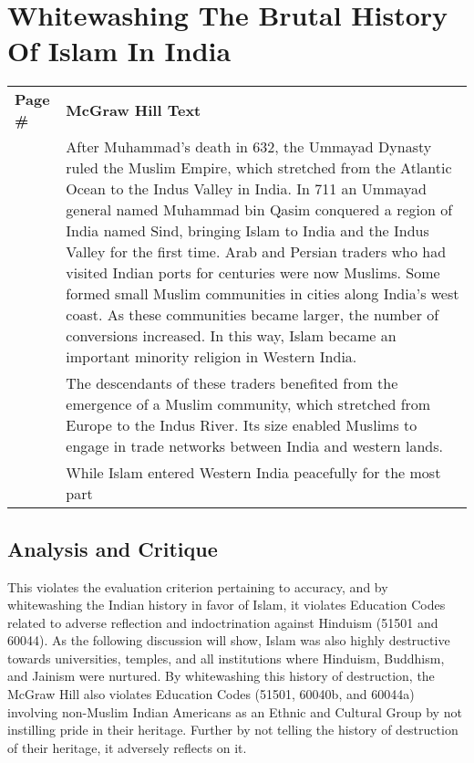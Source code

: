 \chapter{Whitewashing The Brutal History Of Islam In India}

\begin{longtable}{|>{\raggedleft}p{1.5cm}|p{8.5cm}|}
\multicolumn{2}{c}{\textbf{Table: 1}}\\ 
\hline
\textbf{Page \#} & \textbf{McGraw Hill Text} \tabularnewline
\hline
166 & After Muhammad’s death in 632, the Ummayad Dynasty ruled the Muslim Empire, which stretched from the Atlantic Ocean to the Indus Valley in India. In 711 an Ummayad general named Muhammad bin Qasim conquered a region of India named Sind, bringing Islam to India and the Indus Valley for the first time. Arab and Persian traders who had visited Indian ports for centuries were now Muslims. Some formed small Muslim communities in cities along India’s west coast. As these communities became larger, the number of conversions increased. In this way, Islam became an important minority religion in Western India. \tabularnewline
\hline
166 & The descendants of these traders benefited from the emergence of a Muslim community, which stretched from Europe to the Indus River. Its size enabled Muslims to engage in trade networks between India and western lands. \tabularnewline
\hline
166 & While Islam entered Western India peacefully for the most part \tabularnewline
\hline
\end{longtable}

\section*{Analysis and Critique} 

This violates the evaluation criterion pertaining to accuracy, and by whitewashing the Indian history in favor of Islam, it violates Education Codes related to adverse reflection and indoctrination against Hinduism (51501 and 60044). As the following discussion will show, Islam was also highly destructive towards universities, temples, and all institutions where Hinduism, Buddhism, and Jainism were nurtured. By whitewashing this history of destruction, the McGraw Hill also violates Education Codes (51501, 60040b, and 60044a) involving non-Muslim Indian Americans as an Ethnic and Cultural Group by not instilling pride in their heritage. Further by not telling the history of destruction of their heritage, it adversely reflects on it. 

